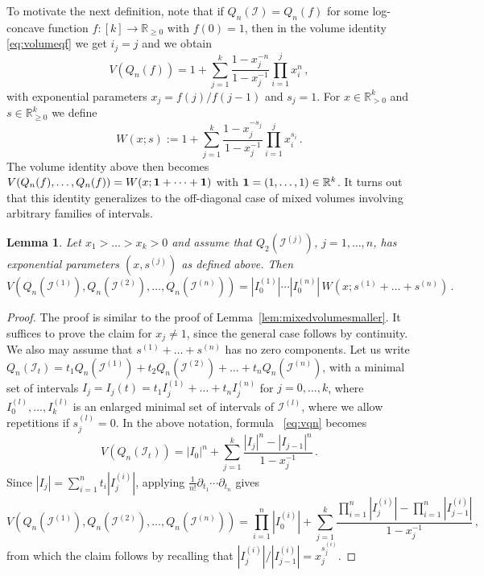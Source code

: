 \documentclass[a4paper,reqno,12pt]{amsart}
\newtheorem{lemma}[theorem]{Lemma}
\newcommand{\I}{\mathscr{I}}
\renewcommand{\r}{\mathbb{R}}
\newcommand{\1}{\bo{1}}
\begin{document}
To motivate the next definition, note that if $Q_n(\I)=Q_n(f)$ for some log-concave function $f:[k]\to\r_{\geq 0}$ with $f(0)=1$, then in the volume identity \eqref{eq:volumeqf} we get $i_j=j$ and we obtain
    \[
    V(Q_n(f)) = 1+\sum_{j=1}^{k}\frac{1-x_j^{-n}}{1-x_j^{-1}}\prod_{i=1}^{j}x_i^{n}\,,
    \]
    with exponential parameters $x_j=f(j)/f(j-1)$ and $s_j=1$. For $x\in\r_{>0}^{k}$ and $s\in\r_{\ge0}^{k}$ we define
\begin{equation} \label{eq:Wdef}
	W(x;s) := 1+\sum_{j=1}^{k}\frac{1-x_j^{-s_j}}{1-x_j^{-1}}\prod_{i=1}^{j}x_i^{s_i}\,.
\end{equation}
The volume identity above then becomes $V(Q_n(f),\dots,Q_n(f))=W(x;{\bf 1} + \dots +{\bf 1})$ with ${\bf 1}=(1,\dots,1)\in \r^k$.
It turns out that this identity generalizes to the off-diagonal case of mixed volumes involving arbitrary families of intervals.
\begin{lemma} \label{lem:generalmv}
	Let $x_1>\dots>x_k>0$ and assume that $Q_2(\I^{(j)})$, $j=1,\dots,n$, has exponential parameters $(x,s^{(j)})$ as defined above. Then
	\begin{equation} \label{eq:generalmv}
		V(Q_n(\I^{(1)}),Q_n(\I^{(2)}),\dots,Q_n(\I^{(n)})) = |I_0^{(1)}|\cdots |I_0^{(n)}|\,W(x;s^{(1)}+\dots+s^{(n)})\,.
	\end{equation}
\end{lemma}
\begin{proof} The proof is similar to the proof of Lemma~\ref{lem:mixedvolumesmaller}.
	It suffices to prove the claim for $x_j\ne1$, since the general case follows by continuity. We also may assume that $s^{(1)}+\dots+s^{(n)}$ has no zero components. Let us write $Q_n(\I_t)=t_1Q_n(\I^{(1)})+t_2Q_n(\I^{(2)})+\dots+t_nQ_n(\I^{(n)})$, with a minimal set of intervals 
	$I_j=I_j(t)=t_1I_j^{(1)}+ \dots+t_n I_j^{(n)}$ for $j=0,\dots,k$, where $I_0^{(l)},\dots,I_k^{(l)}$ is an enlarged minimal set of intervals of $\I^{(l)}$, where we allow repetitions if $s_j^{(l)}=0$. In the above notation, formula ~\eqref{eq:vqn} becomes
	\[ V(Q_n(\I_t)) = |I_0|^n
	+ \sum_{j=1}^{k}\frac{|I_{j}|^n-|I_{j-1}|^n}{1-x_j^{-1}}\,.\]
	Since $|I_j|=\sum_{i=1}^{n}t_i|I_j^{(i)}|$, applying $\frac{1}{n!}\partial_{t_1}\cdots\partial_{t_n}$ gives
	\[V(Q_n(\I^{(1)}),Q_n(\I^{(2)}),\dots,Q_n(\I^{(n)})) =  \prod_{i=1}^{n}|I_0^{(i)}|
	+ \sum_{j=1}^{k}\frac{\prod_{i=1}^{n}|I_{j}^{(i)}|-\prod_{i=1}^{n}|I_{j-1}^{(i)}|}{1-x_j^{-1}}\,,\]
	from which the claim follows by recalling that $|I_{j}^{(i)}|/|I_{j-1}^{(i)}|=x_j^{s_{j}^{(i)}}$.
\end{proof}
\end{document}
